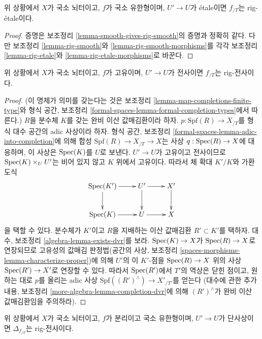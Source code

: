 \begin{lemma}
\label{lemma-etale-gives-rig-etale}
위 상황에서 $X$가 국소 뇌터이고, $f$가 국소 유한형이며,
$U' \to U$가 \'etale이면 $f_{/T}$는 rig-\'etale이다.
\end{lemma}

\begin{proof}
증명은 보조정리 \ref{lemma-smooth-gives-rig-smooth}의 증명과 정확히 같다.
다만 보조정리 \ref{lemma-rig-smooth}와
\ref{lemma-rig-smooth-morphisms}를 각각 보조정리
\ref{lemma-rig-etale}와 \ref{lemma-rig-etale-morphisms}로 바꾼다.
\end{proof}

\begin{lemma}
\label{lemma-completion-proper-surjective-rig-surjective}
위 상황에서 $X$가 국소 뇌터이고, $f$가 고유이며,
$U' \to U$가 전사이면 $f_{/T}$는 rig-전사이다.
\end{lemma}

\begin{proof}
(이 명제가 의미를 갖는다는 것은 보조정리
\ref{lemma-map-completions-finite-type}와 형식 공간, 보조정리
\ref{formal-spaces-lemma-formal-completion-types}에서 따른다.)
$R$을 분수체 $K$를 갖는 완비 이산 값매김환이라 하자.
$p : \text{Spf}(R) \to X_{/T}$를 형식 대수 공간의 adic 사상이라 하자.
형식 공간, 보조정리
\ref{formal-spaces-lemma-adic-into-completion}에 의해 합성
$\text{Spf}(R) \to X_{/T} \to X$는 사상
$q : \mathop{\mathrm{Spec}}(R) \to X$에 대응하며, 이 사상은 $\mathop{\mathrm{Spec}}(K)$를 $U$로 보낸다.
$U' \to U$가 고유이고 전사이므로
$\mathop{\mathrm{Spec}}(K) \times_U U'$는 비어 있지 않고 $K$ 위에서 고유이다.
따라서 체 확대 $K'/K$와 가환 도식
$$
\xymatrix{
\Spec(K') \ar[r] \ar[d] & U' \ar[r] \ar[d] & X' \ar[d] \\
\Spec(K) \ar[r] & U \ar[r] & X
}
$$
을 택할 수 있다. 분수체가 $K'$이고 $R$을 지배하는 이산 값매김환
$R' \subset K'$를 택하자. 대수, 보조정리
\ref{algebra-lemma-exists-dvr}를 보라.
$\mathop{\mathrm{Spec}}(K) \to X$가 $\mathop{\mathrm{Spec}}(R) \to X$로 연장되므로 고유성의 값매김
판정법(공간의 사상, 보조정리
\ref{spaces-morphisms-lemma-characterize-proper})에 의해
$U'$의 이 $K'$-점을 $\mathop{\mathrm{Spec}}(R) \to X$ 위의 사상
$\mathop{\mathrm{Spec}}(R') \to X'$로 연장할 수 있다.
따라서 $\mathop{\mathrm{Spec}}(R')$에서 $T'$의 역상은 닫힌 점이고, 원하는 대로
$p$를 올리는 adic 사상
$\text{Spf}((R')^\wedge) \to X'_{/T'}$를 얻는다
(대수에 관한 추가 내용, 보조정리
\ref{more-algebra-lemma-completion-dvr}에 의해 $(R')^\wedge$가 완비 이산
값매김환임을 주의하라).
\end{proof}

\begin{lemma}
\label{lemma-separated-mono-open-diagonal-rig-surjective}
위 상황에서 $X$가 국소 뇌터이고, $f$가 분리이고 국소 유한형이며,
$U' \to U$가 단사상이면 $\Delta_{f_{/T}}$는 rig-전사이다.
\end{lemma}

